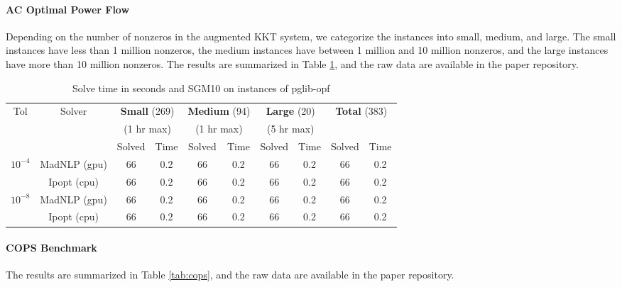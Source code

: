 \documentclass{article}
\begin{document}
\paragraph{AC Optimal Power Flow}
Depending on the number of nonzeros in the augmented KKT system, we categorize the instances into small, medium, and large. The small instances have less than 1 million nonzeros, the medium instances have between 1 million and 10 million nonzeros, and the large instances have more than 10 million nonzeros. The results are summarized in Table \ref{tab:pglib-opf}, and the raw data are available in the paper repository.

\begin{table}[t]
  \centering\small
  \caption{Solve time in seconds and SGM10 on instances of pglib-opf}\label{tab:pglib-opf}
  \begin{tabular}{|c|c|cc|cc|cc|cc|}
    \hline
    \multirow{ 3}{*}{Tol} & \multirow{ 3}{*}{Solver} & \multicolumn{2}{c|}{\textbf{Small} (269)}& \multicolumn{2}{c|}{\textbf{Medium} (94)}& \multicolumn{2}{c|}{\textbf{Large} (20)}& \multicolumn{2}{c|}{\multirow{2}{*}{\textbf{Total} (383)}}\\
                          && \multicolumn{2}{c|}{(1 hr max)}& \multicolumn{2}{c|}{(1 hr max)}& \multicolumn{2}{c|}{(5 hr max)}&&\\
                          &&  Solved & Time &  Solved & Time &  Solved & Time &  Solved & Time \\
    \hline
    \multirow{2}{*}{$10^{-4}$} & MadNLP (gpu) & 66 & 0.2 & 66 & 0.2 & 66 & 0.2 & 66 & 0.2  \\
                          & Ipopt (cpu) & 66 & 0.2 & 66 & 0.2 & 66 & 0.2 & 66 & 0.2 \\
    \hline
    \multirow{2}{*}{$10^{-8}$} & MadNLP (gpu) & 66 & 0.2 & 66 & 0.2 & 66 & 0.2& 66 & 0.2 \\
                          & Ipopt (cpu) & 66 & 0.2 & 66 & 0.2 & 66 & 0.2& 66 & 0.2 \\
    \hline
  \end{tabular}  
\end{table}


\paragraph{COPS Benchmark}
The results are summarized in Table \ref{tab:cops}, and the raw data are available in the paper repository.
\end{document}
